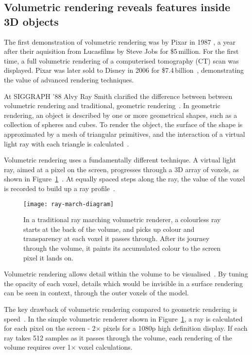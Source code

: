 \subsection{Volumetric rendering reveals features inside 3D objects} \label{sec:volumerendering}
The first demonstration of volumetric rendering was by Pixar in 1987 \cite{smith1987volume}, a year after their aquisition from Lucasfilms by Steve Jobs for \$5\,million.
For the first time, a full volumetric rendering of a computerised tomography (CT) scan was displayed.
Pixar was later sold to Disney in 2006 for \$7.4\,billion~\cite{pixar2007story, pixar2018our}, demonstrating the value of advanced rendering techniques.

At SIGGRAPH '88 Alvy Ray Smith clarified the difference between between volumetric rendering and traditional, geometric rendering~\cite{siggraph1988panel}.
In geometric rendering, an object is described by one or more geometrical shapes, such as a collection of spheres and cubes.
To render the object, the surface of the shape is approximated by a mesh of triangular primitives, and the interaction of a virtual light ray with each triangle is calculated~\cite{buss20033d}.

Volumetric rendering uses a fundamentally different technique.
A virtual light ray, aimed at a pixel on the screen, progresses through a 3D array of voxels, as shown in Figure~\ref{fig:raymarch-diagram}~\cite{tuy1984direct}.
At equally spaced steps along the ray, the value of the voxel is recorded to build up a ray profile~\cite{levoy1988display}.

\begin{figure}[htbp!]
\centering
\texttt{[image: ray-march-diagram]}
\caption[FPBioimage: Raymarching facilitates volumetric rendering of 3D data]{In a traditional ray marching volumetric renderer, a colourless ray starts at the back of the volume, and picks up colour and transparency at each voxel it passes through. After its journey through the volume, it paints its accumulated colour to the screen pixel it lands on. }
\label{fig:raymarch-diagram}
\end{figure}

Volumetric rendering allows detail within the volume to be visualised~\cite{drebin1988volume}.
By tuning the opacity of each voxel, details which would be invisible in a surface rendering can be seen in context, through the outer voxels of the model.

The key drawback of volumetric rendering compared to geometric rendering is speed~\cite{dachille1998high}.
In the simple volumetric renderer shown in Figure~\ref{fig:raymarch-diagram}, a ray is calculated for each pixel on the screen - 2$\times$ pixels for a 1080p high definition display.
If each ray takes \num{512} samples as it passes through the volume, each rendering of the volume requires over 1$\times$ voxel calculations.

